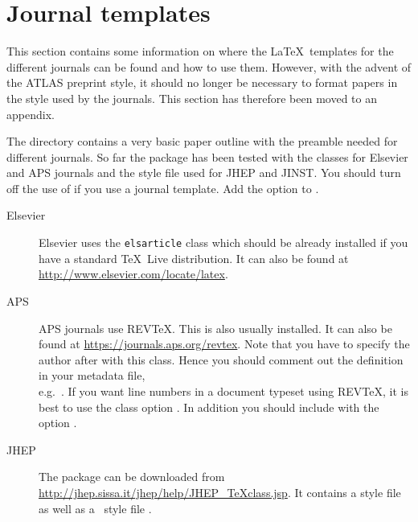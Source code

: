 \section{Journal templates}
\label{sec:journal}

This section contains some information on where the \LaTeX\ templates for the different journals can be found and how to use them.
However, with the advent of the ATLAS preprint style, 
it should no longer be necessary to format papers in the style used by the journals.
This section has therefore been moved to an appendix.

The directory  contains a very basic paper outline with the preamble needed for different journals.
So far the  package has been tested with the classes for Elsevier and APS journals and the style file used for JHEP and JINST.
You should turn off the use of  if you use a journal template.
Add the option  to .

\begin{description}
\item[Elsevier]Elsevier uses the \texttt{elsarticle} class which should be already installed if you have a standard 
  \TeX\ Live distribution. 
  It can also be found at \url{http://www.elsevier.com/locate/latex}.
  
\item[APS]APS journals use REV\TeX. This is also usually installed.
  It can also be found at \url{https://journals.aps.org/revtex}.
  Note that you have to specify the author after \verb|| with this class.
  Hence you should comment out the definition in your metadata file,\\
  e.g.\ .
  If you want line numbers in a document typeset using REV\TeX, it is best to use the class option .
  In addition you should include  with the option .
  
\item[JHEP]The package can be downloaded from \url{http://jhep.sissa.it/jhep/help/JHEP_TeXclass.jsp}. It contains a style file  as well as a \BibTeX\ style file . 
\end{description}


